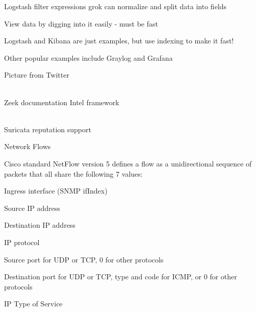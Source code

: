 \documentclass[Screen16to9,17pt]{foils}
\begin{document}
\begin{list2}
\item Logstash filter expressions grok can normalize and split data into fields
\end{list2}





\begin{list1}
\item View data by digging into it easily - must be fast
\item Logstash and Kibana are just examples, but use indexing to make it fast!
\item Other popular examples include Graylog and Grafana
\end{list1}




Picture from Twitter\\
\\



\begin{list1}
\item Zeek documentation Intel framework\\
\\
\item Suricata reputation support\\
\end{list1}






\begin{list1}
\item Network Flows
\item Cisco standard NetFlow version 5 defines a flow as a unidirectional sequence of packets that all share the following 7 values:
\begin{list2}
\item Ingress interface (SNMP ifIndex)
\item Source IP address
\item Destination IP address
\item IP protocol
\item Source port for UDP or TCP, 0 for other protocols
\item Destination port for UDP or TCP, type and code for ICMP, or 0 for other protocols
\item IP Type of Service
\end{list2}
\end{list1}
\end{document}
